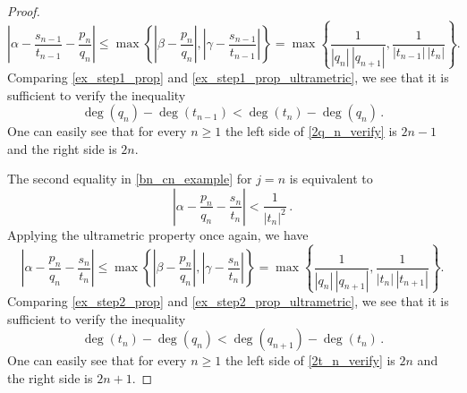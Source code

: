 \documentclass[10pt,a4paper]{amsart}
\begin{document}
\begin{proof}
\begin{equation}
\label{ex_step1_prop_ultrametric}
\left|\alpha-\frac{s_{n-1}}{t_{n-1}}-\frac{p_n}{q_n}\right|\le
\max\left\{\left|\beta-\frac{p_n}{q_n}\right|,\left|\gamma-\frac{s_{n-1}}{t_{n-1}}\right| \right\}=\max\left\{\frac{1}{|q_n|\,|q_{n+1}|}, \frac{1}{|t_{n-1}|\,|t_n|}\right\}.
\end{equation}
Comparing \eqref{ex_step1_prop} and \eqref{ex_step1_prop_ultrametric}, we see that it is sufficient to verify the inequality
\begin{equation}
\label{2q_n_verify}
\deg(q_n) - \deg(t_{n-1}) < \deg(t_n) - \deg(q_n) \,.
\end{equation}
One can easily see that for every $n\ge 1$ the left side of \eqref{2q_n_verify} is $2n-1$ and the right side is $2n$.

The second equality in \eqref{bn_cn_example} for $j=n$ is 
equivalent to
\begin{equation}
\label{ex_step2_prop}
\left|\alpha-\frac{p_{n}}{q_{n}}-\frac{s_n}{t_n}\right|<\frac{1}{|t_n|^2}\,.
\end{equation}
Applying the ultrametric property once again, we have
\begin{equation}
\label{ex_step2_prop_ultrametric}
\left|\alpha-\frac{p_{n}}{q_{n}}-\frac{s_n}{t_n}\right|\le
\max\left\{\left|\beta-\frac{p_n}{q_n}\right|,\left|\gamma-\frac{s_{n}}{t_{n}}\right| \right\}=\max\left\{\frac{1}{|q_n|\,|q_{n+1}|}, \frac{1}{|t_{n}|\,|t_{n+1}|}\right\}.
\end{equation}
Comparing \eqref{ex_step2_prop} and \eqref{ex_step2_prop_ultrametric}, we see that it is sufficient to verify the inequality
\begin{equation}
\label{2t_n_verify}
\deg(t_n) - \deg(q_n) < \deg(q_{n+1}) - \deg(t_n)\,.   
\end{equation}
One can easily see that for every $n\ge 1$ the left side of  \eqref{2t_n_verify} is $2n$ and the right side is $2n+1$.
\end{proof}
\end{document}
